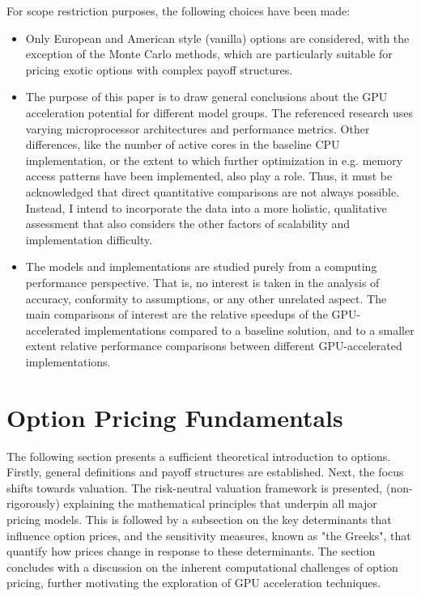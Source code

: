 \documentclass[english,12pt,a4paper,pdftex,sci,utf8]{aaltothesis}
\begin{document}
For scope restriction purposes, the following choices have been made:
\begin{itemize}
    \item Only European and American style (vanilla) options are considered, with the exception of the Monte Carlo methods, which are particularly suitable for pricing exotic options with complex payoff structures.
    
    \item The purpose of this paper is to draw general conclusions about the GPU acceleration potential for different model groups. The referenced research uses varying microprocessor architectures and performance metrics. Other differences, like the number of active cores in the baseline CPU implementation, or the extent to which further optimization in e.g. memory access patterns have been implemented, also play a role. Thus, it must be acknowledged that direct quantitative comparisons are not always possible. Instead, I intend to incorporate the data into a more holistic, qualitative assessment that also considers the other factors of scalability and implementation difficulty.

    \item The models and implementations are studied purely from a computing performance perspective. That is, no interest is taken in the analysis of accuracy, conformity to assumptions, or any other unrelated aspect. The main comparisons of interest are the relative speedups of the GPU-accelerated implementations compared to a baseline solution, and to a smaller extent relative performance comparisons between different GPU-accelerated implementations.
\end{itemize}


\clearpage

\section{Option Pricing Fundamentals} \label{sec:optionfundamentals}

The following section presents a sufficient theoretical introduction to options. Firstly, general definitions and payoff structures are established. Next, the focus shifts towards valuation. The risk-neutral valuation framework is presented, (non-rigorously) explaining the mathematical principles that underpin all major pricing models. This is followed by a subsection on the key determinants that influence option prices, and the sensitivity measures, known as "the Greeks", that quantify how prices change in response to these determinants. The section concludes with a discussion on the inherent computational challenges of option pricing, further motivating the exploration of GPU acceleration techniques.
\end{document}
